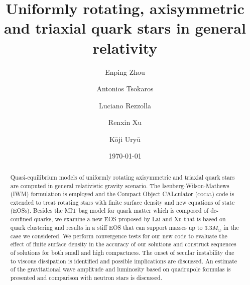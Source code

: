 \documentclass[twocolumn,superscriptaddress,showpacs,prd,aps,amsmath,amssymb,nofootinbib]{revtex4-1}
\newcommand{\cocal}{\textsc{cocal}}
\begin{document}
\title{Uniformly rotating, axisymmetric and triaxial quark stars in general relativity}

\author{Enping Zhou}
 

\author{Antonios Tsokaros}
 

\author{Luciano Rezzolla}
 

\author{Renxin Xu}
 

\author{K\=oji Ury\=u}

\date{\today}



\begin{abstract}
Quasi-equilibrium models of uniformly rotating axisymmetric and triaxial
quark stars are computed in general relativistic gravity scenario. The
Isenberg-Wilson-Mathews (IWM) formulation is employed and the Compact
Object CALculator (\cocal{}) code is extended to treat rotating stars
with finite surface density and new equations of state (EOSs). Besides
the MIT bag model for quark matter which is composed of de-confined
quarks, we examine a new EOS proposed by Lai and Xu that is based on
quark clustering and results in a stiff EOS that can support masses up to
$3.3M_\odot$ in the case we considered. We perform convergence tests for
our new code to evaluate the effect of finite surface density in the
accuracy of our solutions and construct sequences of solutions for both
small and high compactness. The onset of secular instability due to
viscous dissipation is identified and possible implications are
discussed. An estimate of the gravitational wave amplitude and luminosity
based on quadrupole formulas is presented and comparison with neutron
stars is discussed.
\end{abstract}
\end{document}
